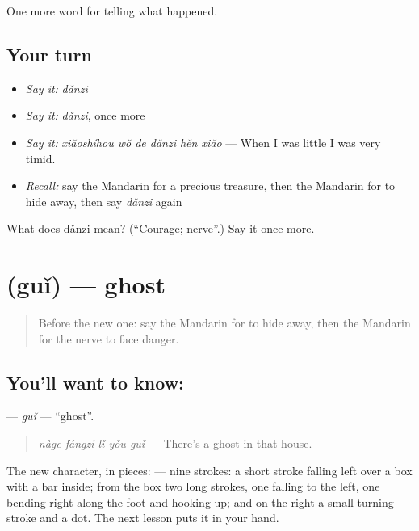 \begin{grammarlens}[title={What you've built}]
One more word for telling what happened.
\end{grammarlens}

\subsection*{Your turn}
\begin{itemize}
\raggedright
  \item \emph{Say it:} \emph{dǎnzi}
  \item \emph{Say it:} \emph{dǎnzi}, once more
  \item \emph{Say it:} \emph{xiǎoshíhou wǒ de dǎnzi hěn xiǎo} — When I was little I was very timid.
  \item \emph{Recall:} say the Mandarin for a precious treasure, then the Mandarin for to hide away, then say \emph{dǎnzi} again
\end{itemize}

\begin{tcolorbox}[breakable,colback=teal!4,colframe=teal!35!black,title={Before you move on}]
What does dǎnzi mean? (\textquotedblleft{}Courage; nerve\textquotedblright{}.) Say it once more.
\end{tcolorbox}
\section[\texorpdfstring{\zh{鬼} (guǐ)}{鬼 (guǐ)}]{ (guǐ) — ghost}

\label{lesson:ZH-C332-gui}



\begin{quote}
Before the new one: say the Mandarin for to hide away, then the Mandarin for the nerve to face danger.
\end{quote}

\subsection*{You'll want to know: }
\textbf{} — \emph{guǐ} — \textquotedblleft{}ghost\textquotedblright{}.

\begin{quote}
\textbf{} \emph{nàge fángzi lǐ yǒu guǐ} — There's a ghost in that house.
\end{quote}

The new character, in pieces:  — nine strokes: a short stroke falling left over a box with a bar inside; from the box two long strokes, one falling to the left, one bending right along the foot and hooking up; and on the right a small turning stroke and a dot. The next lesson puts it in your hand.

